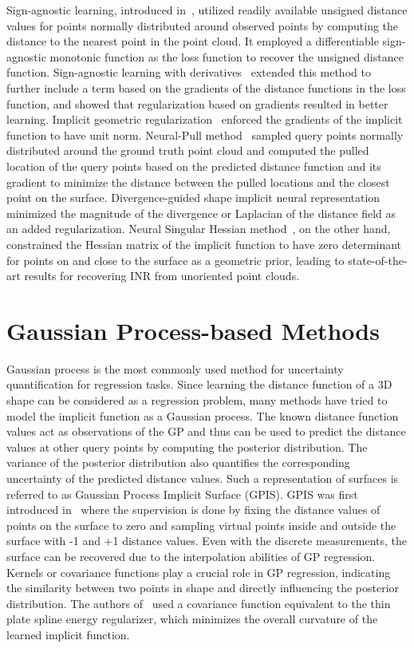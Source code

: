 Sign-agnostic learning, introduced in~\cite{SAL}, utilized readily available unsigned distance values for points normally distributed around observed points by computing the distance to the nearest point in the point cloud. It employed a differentiable sign-agnostic monotonic function as the loss function to recover the unsigned distance function. Sign-agnostic learning with derivatives~\cite{SALD} extended this method to further include a term based on the gradients of the distance functions in the loss function, and showed that regularization based on gradients resulted in better learning. Implicit geometric regularization~\cite{IGR} enforced the gradients of the implicit function to have unit norm. Neural-Pull method~\cite{NeuralPull} sampled query points normally distributed around the ground truth point cloud and computed the pulled location of the query points based on the predicted distance function and its gradient to minimize the distance between the pulled locations and the closest point on the surface. Divergence-guided shape implicit neural representation~\cite{DiGS} minimized the magnitude of the divergence or Laplacian of the distance field as an added regularization. Neural Singular Hessian method~\cite{NeuralHessian}, on the other hand, constrained the Hessian matrix of the implicit function to have zero determinant for points on and close to the surface as a geometric prior, leading to state-of-the-art results for recovering INR from unoriented point clouds.


\section{Gaussian Process-based Methods}\label{Stoch-old}
Gaussian process is the most commonly used method for uncertainty quantification for regression tasks. Since learning the distance function of a 3D shape can be considered as a regression problem, many methods have tried to model the implicit function as a Gaussian process. The known distance function values act as observations of the GP and thus can be used to predict the distance values at other query points by computing the posterior distribution. The variance of the posterior distribution also quantifies the corresponding uncertainty of the predicted distance values. Such a representation of surfaces is referred to as Gaussian Process Implicit Surface (GPIS). GPIS was first introduced in~\cite{GPIS} where the supervision is done by fixing the distance values of points on the surface to zero and sampling virtual points inside and outside the surface with -1 and +1 distance values. Even with the discrete measurements, the surface can be recovered due to the interpolation abilities of GP regression. Kernels or covariance functions play a crucial role in GP regression, indicating the similarity between two points in shape and directly influencing the posterior distribution. The authors of~\cite{GPIS} used a covariance function equivalent to the thin plate spline energy regularizer, which minimizes the overall curvature of the learned implicit function. 
\newline

